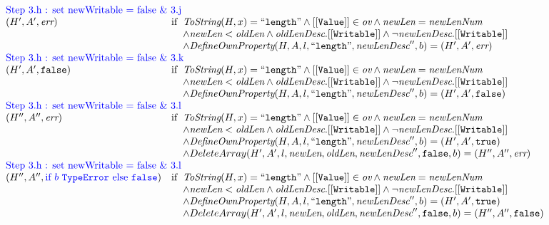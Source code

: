 \documentclass[a4paper, leqno]{amsart}
\newcommand{\rejectb}{\inblue\mbox{if}\ b\ \te\ \mbox{else}\ \false}
\def\inblue{\color{blue}}
\newcommand{\false}{{\tt false}}
\newcommand{\true}{{\tt true}}
\newcommand{\err}{\emph{err}}
\newcommand{\te}{{\tt TypeError}}
\newcommand{\hf}[1]{\emph{#1}}
\newcommand{\ifc}[1]{{\rm if}\begin{array}[t]{l}#1\end{array}}
\newcommand{\ov}{\emph{ov}}
\def\inblue{\color{blue}}
\begin{document}
\[\begin{array}{l@{}c@{}l}
{\begin{array}{ll}
\multicolumn{2}{l}{\mbox{\inblue Step 3.h : set newWritable = false \& 3.j}}\\
(H',A', \err)   &\ifc{\hf{ToString}(H, x) = ``{\tt length}" \wedge [[{\tt Value}]] \in \ov \wedge \hf{newLen} = \hf{newLenNum} \\
    \wedge \hf{newLen} < \hf{oldLen} \wedge \hf{oldLenDesc}.{\tt[[Writable]]} \wedge \neg\hf{newLenDesc}.{\tt[[Writable]]} \\
    \wedge \hf{DefineOwnProperty}(H, A, l, ``{\tt length}", \hf{newLenDesc}'', b) = (H', A', \err) }\\

\multicolumn{2}{l}{\mbox{\inblue Step 3.h : set newWritable = false \& 3.k}}\\
(H',A', \false)   &\ifc{\hf{ToString}(H, x) = ``{\tt length}" \wedge [[{\tt Value}]] \in \ov \wedge \hf{newLen} = \hf{newLenNum} \\
    \wedge \hf{newLen} < \hf{oldLen} \wedge \hf{oldLenDesc}.{\tt[[Writable]]} \wedge \neg\hf{newLenDesc}.{\tt[[Writable]]} \\
    \wedge \hf{DefineOwnProperty}(H, A, l, ``{\tt length}", \hf{newLenDesc}'', b) = (H', A', \false) }\\

\multicolumn{2}{l}{\mbox{\inblue Step 3.h : set newWritable = false \& 3.l}}\\
(H'',A'', \err)   &\ifc{\hf{ToString}(H, x) = ``{\tt length}" \wedge [[{\tt Value}]] \in \ov \wedge \hf{newLen} = \hf{newLenNum} \\
    \wedge \hf{newLen} < \hf{oldLen} \wedge \hf{oldLenDesc}.{\tt[[Writable]]} \wedge \neg\hf{newLenDesc}.{\tt[[Writable]]} \\
    \wedge \hf{DefineOwnProperty}(H, A, l, ``{\tt length}", \hf{newLenDesc}'', b) = (H', A', \true) \\
    \wedge DeleteArray(H', A',l, \hf{newLen}, \hf{oldLen}, \hf{newLenDesc}'', \false, b) = (H'', A'', \err)}\\

\multicolumn{2}{l}{\mbox{\inblue Step 3.h : set newWritable = false \& 3.l}}\\
(H'',A'', {\rejectb})   &\ifc{\hf{ToString}(H, x) = ``{\tt length}" \wedge [[{\tt Value}]] \in \ov \wedge \hf{newLen} = \hf{newLenNum} \\
    \wedge \hf{newLen} < \hf{oldLen} \wedge \hf{oldLenDesc}.{\tt[[Writable]]} \wedge \neg\hf{newLenDesc}.{\tt[[Writable]]} \\
    \wedge \hf{DefineOwnProperty}(H, A, l, ``{\tt length}", \hf{newLenDesc}'', b) = (H', A', \true) \\
    \wedge DeleteArray(H', A',l, \hf{newLen}, \hf{oldLen}, \hf{newLenDesc}'', \false, b) = (H'', A'', \false)}\\



\end{array}}
\end{array}\]
\end{document}
